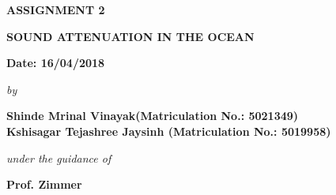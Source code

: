 \begin{center}
\vspace{-2.9cm}
\vspace{1.5cm}
\bfseries{ASSIGNMENT 2}\\
\vspace{0.5cm}
\begin{large}
{\bfseries SOUND ATTENUATION IN THE OCEAN }\\
\end{large}
\vspace{0.3cm}
{\bfseries Date: 16/04/2018 }\\
\vspace{0.4cm}
\begin{small}
\emph{by}\\
\end{small}
\vspace{0.4cm}
\bfseries{Shinde Mrinal Vinayak(Matriculation No.: 5021349)\\Kshisagar Tejashree Jaysinh (Matriculation No.: 5019958)}\\
\vspace{0.3cm}
\begin{small}
\emph{under the guidance of}\\
\end{small}
\vspace{0.3cm}
{\bfseries \large Prof. Zimmer}\\
\vspace{0.1cm}
\end{center}